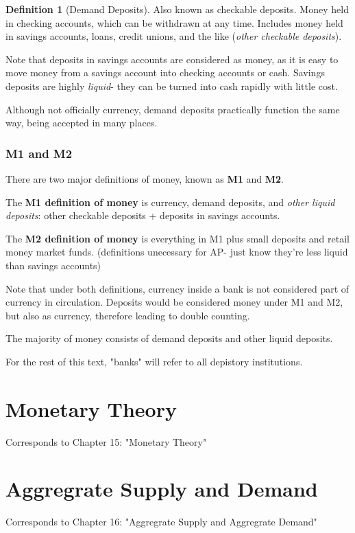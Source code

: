 \documentclass[12pt, a4paper]{article}
\theoremstyle{definition}
\newtheorem{definition}{Definition}
\begin{document}
\begin{definition}[Demand Deposits]
    Also known as checkable deposits.
    Money held in checking accounts, which can be withdrawn at any time.
    Includes money held in savings accounts, loans, credit unions, and the like (\textit{other checkable deposits}).
\end{definition}

Note that deposits in savings accounts are considered as money, as it is easy to move money from a savings account into checking accounts or cash.
Savings deposits are highly \textit{liquid}- they can be turned into cash rapidly with little cost.

Although not officially currency, demand deposits practically function the same way, being accepted in many places.

\subsubsection{M1 and M2}
There are two major definitions of money, known as \textbf{M1} and \textbf{M2}.

The \textbf{M1 definition of money} is currency, demand deposits, and \textit{other liquid deposits}: other checkable deposits + deposits in savings accounts.

The \textbf{M2 definition of money} is everything in M1 plus small deposits and retail money market funds. (definitions unecessary for AP- just know they're less liquid than savings accounts)

Note that under both definitions, currency inside a bank is not considered part of currency in circulation.
Deposits would be considered money under M1 and M2, but also as currency, therefore leading to double counting.

The majority of money consists of demand deposits and other liquid deposits.

For the rest of this text, "banks" will refer to all depistory institutions.



\newpage

\section{Monetary Theory}
Corresponds to Chapter 15: "Monetary Theory"

\newpage

\section{Aggregrate Supply and Demand}
Corresponds to Chapter 16: "Aggregrate Supply and Aggregrate Demand"
\end{document}
